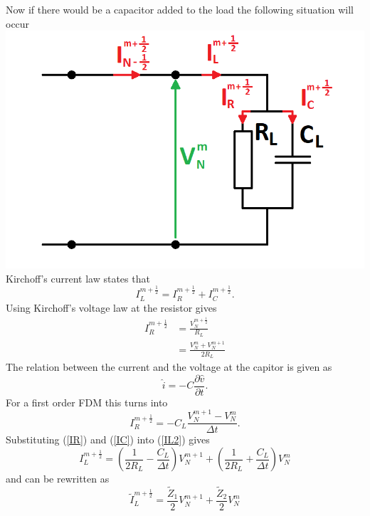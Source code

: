 \documentclass[dutch, a4paper, 11pt]{article}
\begin{document}
\begin{multicols}{2}
\begin{itemize}
    Now if there would be a capacitor added to the load the following situation will occur
    \includegraphics[scale=0.4]{BC2_cap}
    Kirchoff's current law states that
    \begin{equation}
        I^{m+\frac{1}{2}}_{L} = I^{m+\frac{1}{2}}_{R} + I^{m+\frac{1}{2}}_{C}.
        \label{IL2}
    \end{equation}
    Using Kirchoff's voltage law at the resistor gives
    \begin{align}
        I^{m+\frac{1}{2}}_{R} & = \frac{V^{m+\frac{1}{2}}_{N}}{R_{L}}\\
        & = \frac{V^{m}_{N}+V^{m+1}_{N}}{2R_{L}}
        \label{IR}
    \end{align}
    The relation between the current and the voltage at the capitor is given as
    \begin{equation}
        \hat{i} = -C\frac{\partial \hat{v}}{\partial t}.
    \end{equation}
    For a first order FDM this turns into
    \begin{equation}
        I^{m+\frac{1}{2}}_{R} = -C_{L}\frac{V^{m+1}_{N} - V^{m}_{N}}{\Delta t}.
        \label{IC}
    \end{equation}
    Substituting (\ref{IR}) and (\ref{IC}) into (\ref{IL2}) gives
    \begin{equation}
        I^{m+\frac{1}{2}}_{L} = \left(\frac{1}{2R_{L}}-\frac{C_{L}}{\Delta t}\right)V^{m+1}_N + \left(\frac{1}{2R_{L}}+\frac{C_{L}}{\Delta t}\right)V^{m}_N
    \end{equation}
    and can be rewritten as
    \begin{equation}
        \tilde{I}^{m+\frac{1}{2}}_{L} = \frac{\tilde{Z}_{1}}{2}V^{m+1}_N + \frac{\tilde{Z}_{2}}{2}V^{m}_N

\end{equation}
\end{itemize}
\end{multicols}
\end{document}
